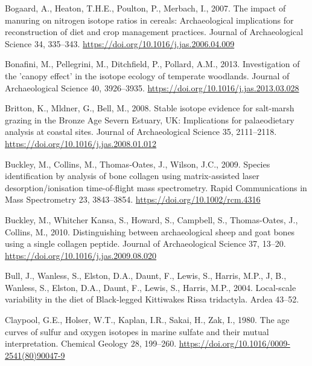 \documentclass[3p]{elsarticle} %
\newlength{\cslhangindent}
\newlength{\cslentryspacingunit} %
\newenvironment{CSLReferences}[2] %
 {%
  \setlength{\parindent}{0pt}
  \ifodd #1
  \let\oldpar\par
  \def\par{\hangindent=\cslhangindent\oldpar}
  \fi
  \setlength{\parskip}{#2\cslentryspacingunit}
 }%
 {}
\begin{document}
\begin{CSLReferences}{1}{0}
\leavevmode{}%
Bogaard, A., Heaton, T.H.E., Poulton, P., Merbach, I., 2007. The impact of manuring on nitrogen isotope ratios in cereals: Archaeological implications for reconstruction of diet and crop management practices. Journal of Archaeological Science 34, 335--343. \url{https://doi.org/10.1016/j.jas.2006.04.009}

\leavevmode{}%
Bonafini, M., Pellegrini, M., Ditchfield, P., Pollard, A.M., 2013. Investigation of the 'canopy effect' in the isotope ecology of temperate woodlands. Journal of Archaeological Science 40, 3926--3935. \url{https://doi.org/10.1016/j.jas.2013.03.028}

\leavevmode{}%
Britton, K., Mldner, G., Bell, M., 2008. Stable isotope evidence for salt-marsh grazing in the {Bronze Age Severn Estuary}, {UK}: Implications for palaeodietary analysis at coastal sites. Journal of Archaeological Science 35, 2111--2118. \url{https://doi.org/10.1016/j.jas.2008.01.012}

\leavevmode{}%
Buckley, M., Collins, M., Thomas‐Oates, J., Wilson, J.C., 2009. Species identification by analysis of bone collagen using matrix-assisted laser desorption/ionisation time-of-flight mass spectrometry. Rapid Communications in Mass Spectrometry 23, 3843--3854. \url{https://doi.org/10.1002/rcm.4316}

\leavevmode{}%
Buckley, M., Whitcher Kansa, S., Howard, S., Campbell, S., Thomas-Oates, J., Collins, M., 2010. Distinguishing between archaeological sheep and goat bones using a single collagen peptide. Journal of Archaeological Science 37, 13--20. \url{https://doi.org/10.1016/j.jas.2009.08.020}

\leavevmode{}%
Bull, J., Wanless, S., Elston, D.A., Daunt, F., Lewis, S., Harris, M.P., J, B., Wanless, S., Elston, D.A., Daunt, F., Lewis, S., Harris, M.P., 2004. Local-scale variability in the diet of {Black}-legged {Kittiwakes Rissa} tridactyla. Ardea 43--52.

\leavevmode{}%
Claypool, G.E., Holser, W.T., Kaplan, I.R., Sakai, H., Zak, I., 1980. The age curves of sulfur and oxygen isotopes in marine sulfate and their mutual interpretation. Chemical Geology 28, 199--260. \url{https://doi.org/10.1016/0009-2541(80)90047-9}


\end{CSLReferences}
\end{document}
